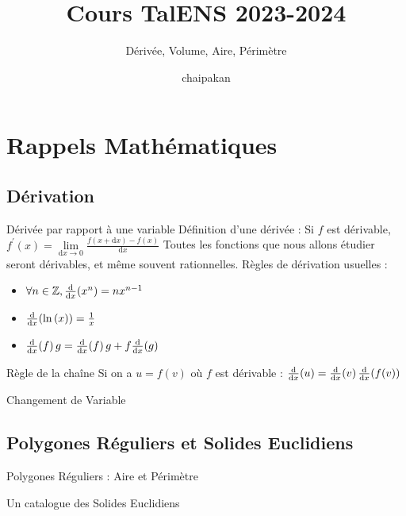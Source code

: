\documentclass{beamercours}
\title{Cours TalENS 2023-2024}
\subtitle{Dérivée, Volume, Aire, Périmètre}
\date{chaipakan}
\begin{document}
\maketitle

    \section{Rappels Mathématiques}
        \subsection{Dérivation}
            \begin{frame}{Dérivée par rapport à une variable}
                Définition d'une dérivée : Si $f$ est dérivable, $f^{'}(x) = \lim\limits_{\mathrm{d}x \rightarrow 0} \frac{f(x + \mathrm{d}x) - f(x)}{\mathrm{d}x}$
                Toutes les fonctions que nous allons étudier seront dérivables, et même souvent rationnelles.
                Règles de dérivation usuelles : 
                \begin{itemize}
                    \item $\forall n \in \mathbb{Z},  \frac{\mathrm{d}}{\mathrm{d}x}\!\left(x^{n}\right) = nx^{n-1}$
                    \item $\frac{\mathrm{d}}{\mathrm{d}x}\!\left(\ln{(x)}\right) = \frac{1}{x}$
                    \item $\frac{\mathrm{d}}{\mathrm{d}x}\!\left(f\right)g = \frac{\mathrm{d}}{\mathrm{d}x}\!\left(f\right)g + f\frac{\mathrm{d}}{\mathrm{d}x}\!\left(g\right) $
                \end{itemize}
            \end{frame}
            
            \begin{frame}{Règle de la chaîne}
                Si on a $u = f(v)$ où $f$ est dérivable : $\frac{\mathrm{d}}{\mathrm{d}x}\!\left(u\right) = \frac{\mathrm{d}}{\mathrm{d}x}\!\left(v\right)\frac{\mathrm{d}}{\mathrm{d}x}\!\left(f(v)\right)$
            \end{frame}
            
            \begin{frame}{Changement de Variable}   
                
            \end{frame}

        \subsection{Polygones Réguliers et Solides Euclidiens}
            \begin{frame}{Polygones Réguliers : Aire et Périmètre}
                
            \end{frame}
            \begin{frame}{Un catalogue des Solides Euclidiens}
                
            \end{frame}
\end{document}
